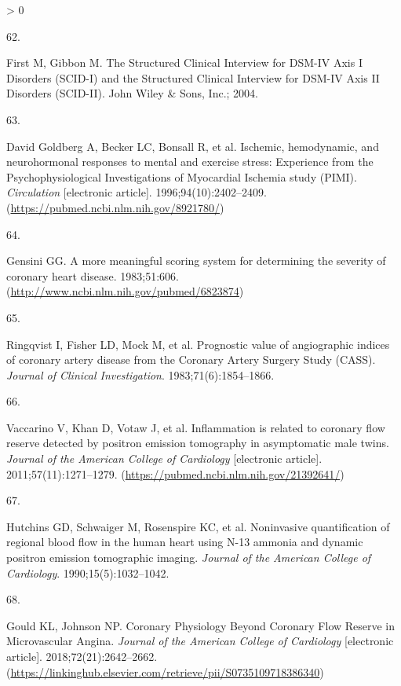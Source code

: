 \documentclass[
  11pt,
  openany]{book}
\newlength{\cslhangindent}
\newlength{\csllabelwidth}
\newenvironment{CSLReferences}[2] %
 {%
  \setlength{\parindent}{0pt}
  \ifodd #1 \everypar{\setlength{\hangindent}{\cslhangindent}}\ignorespaces\fi
  \ifnum #2 > 0
  \setlength{\parskip}{#2\baselineskip}
  \fi
 }%
 {}
\newcommand{\CSLLeftMargin}[1]{\parbox[t]{\csllabelwidth}{#1}}
\newcommand{\CSLRightInline}[1]{\parbox[t]{\linewidth - \csllabelwidth}{#1}\break}
\begin{document}
\begin{CSLReferences}{0}{0}
\leavevmode\hypertarget{ref-First2004}{}%
\CSLLeftMargin{62. }
\CSLRightInline{First M, Gibbon M. {The Structured Clinical Interview for DSM-IV Axis I Disorders (SCID-I) and the Structured Clinical Interview for DSM-IV Axis II Disorders (SCID-II)}. John Wiley {\&} Sons, Inc.; 2004.}

\leavevmode\hypertarget{ref-DavidGoldberg1996}{}%
\CSLLeftMargin{63. }
\CSLRightInline{David Goldberg A, Becker LC, Bonsall R, et al. {Ischemic, hemodynamic, and neurohormonal responses to mental and exercise stress: Experience from the Psychophysiological Investigations of Myocardial Ischemia study (PIMI)}. \emph{Circulation} {[}electronic article{]}. 1996;94(10):2402--2409. (\url{https://pubmed.ncbi.nlm.nih.gov/8921780/})}

\leavevmode\hypertarget{ref-Gensini1983}{}%
\CSLLeftMargin{64. }
\CSLRightInline{Gensini GG. {A more meaningful scoring system for determining the severity of coronary heart disease}. 1983;51:606. (\url{http://www.ncbi.nlm.nih.gov/pubmed/6823874})}

\leavevmode\hypertarget{ref-Ringqvist1983}{}%
\CSLLeftMargin{65. }
\CSLRightInline{Ringqvist I, Fisher LD, Mock M, et al. {Prognostic value of angiographic indices of coronary artery disease from the Coronary Artery Surgery Study (CASS)}. \emph{Journal of Clinical Investigation}. 1983;71(6):1854--1866. }

\leavevmode\hypertarget{ref-Vaccarino2011}{}%
\CSLLeftMargin{66. }
\CSLRightInline{Vaccarino V, Khan D, Votaw J, et al. {Inflammation is related to coronary flow reserve detected by positron emission tomography in asymptomatic male twins}. \emph{Journal of the American College of Cardiology} {[}electronic article{]}. 2011;57(11):1271--1279. (\url{https://pubmed.ncbi.nlm.nih.gov/21392641/})}

\leavevmode\hypertarget{ref-Hutchins1990}{}%
\CSLLeftMargin{67. }
\CSLRightInline{Hutchins GD, Schwaiger M, Rosenspire KC, et al. {Noninvasive quantification of regional blood flow in the human heart using N-13 ammonia and dynamic positron emission tomographic imaging}. \emph{Journal of the American College of Cardiology}. 1990;15(5):1032--1042. }

\leavevmode\hypertarget{ref-Gould2018a}{}%
\CSLLeftMargin{68. }
\CSLRightInline{Gould KL, Johnson NP. {Coronary Physiology Beyond Coronary Flow Reserve in Microvascular Angina}. \emph{Journal of the American College of Cardiology} {[}electronic article{]}. 2018;72(21):2642--2662. (\url{https://linkinghub.elsevier.com/retrieve/pii/S0735109718386340})}


\end{CSLReferences}
\end{document}
